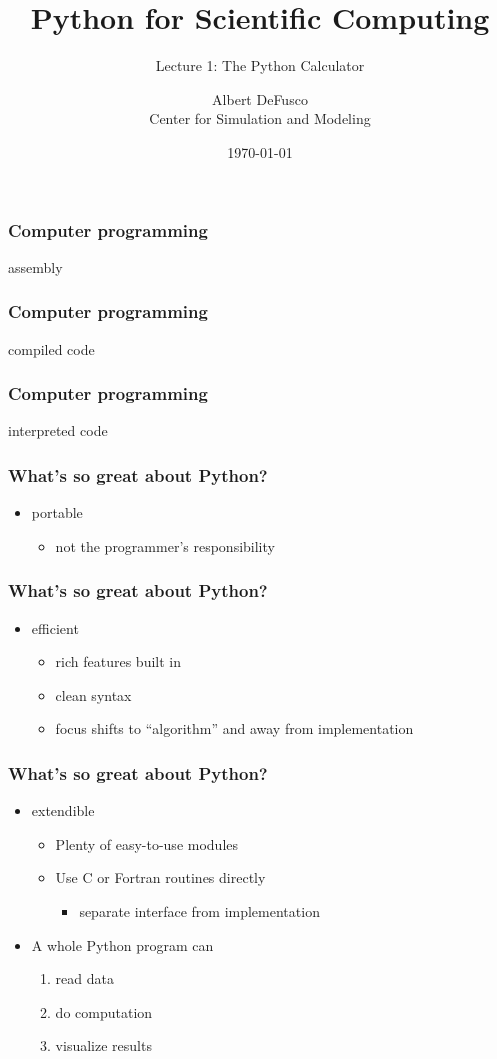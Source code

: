 \documentclass[xcolor=table,10pt,final]{beamer}
\begin{document}
\title{Python for Scientific Computing}
\subtitle{Lecture 1: The Python Calculator}
\author{Albert DeFusco\\Center for Simulation and Modeling}
\date{\today}
\frame{\titlepage}

\begin{frame}
  \frametitle{Computer programming}
    assembly
\end{frame}
\begin{frame}
  \frametitle{Computer programming}
compiled code
\end{frame}
\begin{frame}
  \frametitle{Computer programming}
  interpreted code
\end{frame}

\begin{frame}
  \frametitle{What's so great about Python?}
  \begin{itemize}
    \item portable
      \begin{itemize}
        \item not the programmer's responsibility
      \end{itemize}
  \end{itemize}
\end{frame}
\begin{frame}
  \frametitle{What's so great about Python?}
  \begin{itemize}
    \item efficient
      \begin{itemize}
        \item rich features built in
        \item clean syntax
        \item focus shifts to ``algorithm'' and away from implementation
      \end{itemize}
  \end{itemize}
\end{frame}
\begin{frame}
  \frametitle{What's so great about Python?}
  \begin{itemize}
    \item extendible
      \begin{itemize}
        \item Plenty of easy-to-use modules
        \item Use C or Fortran routines directly
          \begin{itemize}
            \item separate interface from implementation
          \end{itemize}
      \end{itemize}
    \item A whole Python program can
      \begin{enumerate}
        \item read data
        \item do computation
        \item visualize results
      \end{enumerate}
  \end{itemize}
\end{frame}
\end{document}
